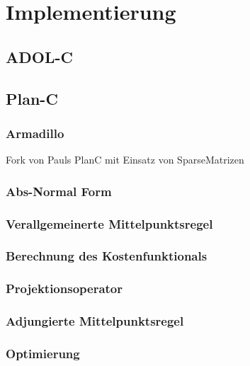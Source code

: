\chapter{Implementierung}
\section{ADOL-C}

\section{Plan-C}
\subsection{Armadillo}
Fork von Pauls PlanC mit Einsatz von SparseMatrizen
\subsection{Abs-Normal Form}

\subsection{Verallgemeinerte Mittelpunktsregel}

\subsection{Berechnung des Kostenfunktionals}
\subsection{Projektionsoperator}

\subsection{Adjungierte Mittelpunktsregel}


\subsection{Optimierung}